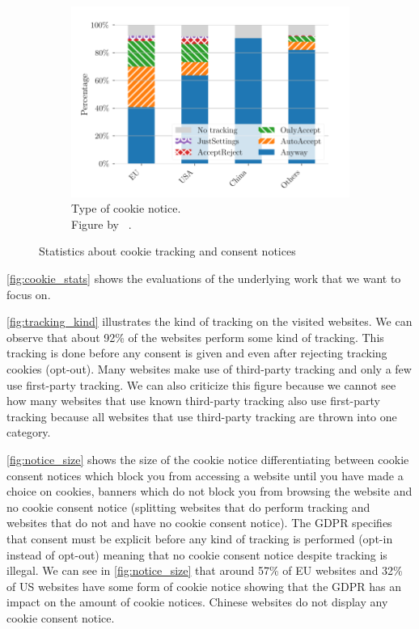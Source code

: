 \begin{figure}
    \begin{subfigure}[b]{.5\textwidth}
        \centering
        \includegraphics[width=\textwidth, scale=0.35]{figures/cookie_notice_type_trans.png}
        \caption{Type of cookie notice.\\Figure by \citeauthor{sanchez2019can}~\cite[Fig.~2b]{sanchez2019can}.}
        \label{fig:notice_type}
    \end{subfigure}
    \caption{Statistics about cookie tracking and consent notices}
    \label{fig:cookie_stats}
\end{figure}

\autoref{fig:cookie_stats} shows the evaluations of the underlying work that we want to focus on.

\autoref{fig:tracking_kind} illustrates the kind of tracking on the visited websites. We can observe that about 92\% of
the websites perform some kind of tracking. This tracking is done before any consent is given and even after rejecting
tracking cookies (opt-out). Many websites make use of third-party tracking and only a few use first-party tracking. We
can also criticize this figure because we cannot see how many websites that use known third-party tracking also use
first-party tracking because all websites that use third-party tracking are thrown into one category.

\autoref{fig:notice_size} shows the size of the cookie notice differentiating between cookie consent notices which block
you from accessing a website until you have made a choice on cookies, banners which do not block you from browsing the
website and no cookie consent notice (splitting websites that do perform tracking and websites that do not and have no
cookie consent notice). The GDPR specifies that consent must be explicit before any kind of tracking is performed
(opt-in instead of opt-out) meaning that no cookie consent notice despite tracking is illegal.
We can see in \autoref{fig:notice_size} that around 57\% of EU websites and 32\% of US
websites have some form of cookie notice showing that the GDPR has an impact on the amount of cookie notices.
Chinese websites do not display any cookie consent notice.

